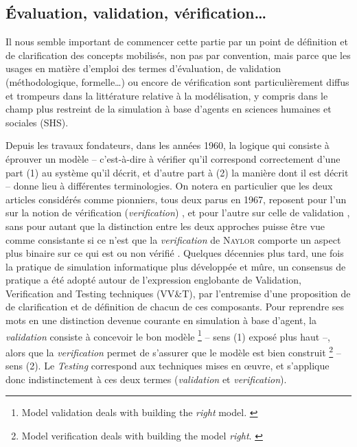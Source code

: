 \subsection{Évaluation, validation, vérification\ldots}

Il nous semble important de commencer cette partie par un point de définition et de clarification des concepts mobilisés, non pas par convention, mais parce que les usages en matière d'emploi des termes d'évaluation, de validation (méthodologique, formelle\ldots) ou encore de vérification sont particulièrement diffus et trompeurs dans la littérature relative à la modélisation, y compris dans le champ plus restreint de la simulation à base d'agents en sciences humaines et sociales (SHS).

Depuis les travaux fondateurs, dans les années 1960, la logique qui consiste à éprouver un modèle -- c'est-à-dire à vérifier qu'il correspond correctement d'une part (1) au système qu'il décrit, et d'autre part à
(2) la manière dont il est décrit -- donne lieu à différentes terminologies.
On notera en particulier que les deux articles considérés comme pionniers, tous deux parus en 1967, reposent pour l'un sur la notion de vérification (\textit{verification}) \autocite{naylor_verification_1967}, et pour l'autre sur celle de validation \autocite{hermann_validation_1967}, sans pour autant que la distinction entre les deux approches puisse être vue comme consistante si ce n'est que la \textit{verification} de \textsc{Naylor} comporte un aspect plus \og binaire\fg{} sur ce qui est ou non vérifié \autocite[137]{rey-coyrehourcq_plateforme_2015}.
Quelques décennies plus tard, une fois la pratique de simulation informatique plus développée et mûre, un consensus de pratique a été adopté autour de l'expression englobante de \og Validation, Verification and Testing techniques (VV\&T)\fg{}, par l'entremise d'une proposition de \textcite{balci_validation_1994} de clarification et de définition de chacun de ces composants.
Pour reprendre ses mots en une distinction devenue courante en simulation à base d'agent, la \textit{validation} consiste à concevoir le bon modèle 
\footnote{
	\og Model validation deals with building the \textit{right} model.\fg{} \autocite[121]{balci_validation_1994}
} -- sens (1) exposé plus haut --,
alors que la \textit{verification} permet de s'assurer que le modèle est bien construit
\footnote{
	\og Model verification deals with building the model \textit{right}.\fg{} \autocite[123]{balci_validation_1994}
} -- sens (2).
Le \og \textit{Testing}\fg{} correspond aux techniques mises en œuvre, et s'applique donc indistinctement à ces deux termes (\textit{validation} et \textit{verification}).


